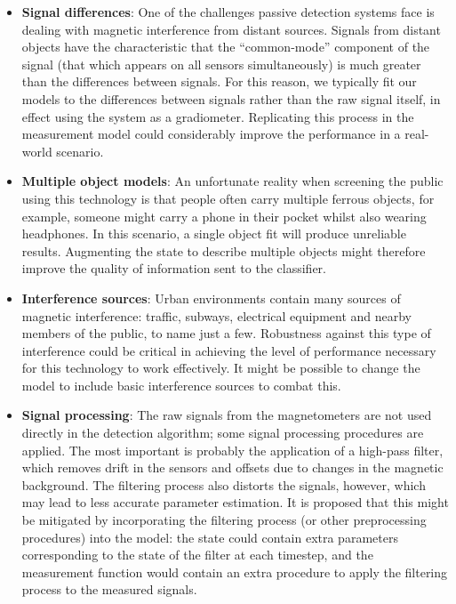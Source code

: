 \documentclass[10pt, a4paper, twocolumn]{article} %
\begin{document}
\begin{itemize}
	\item \textbf{Signal differences}: One of the challenges passive detection systems face is dealing with magnetic interference from distant sources. Signals from distant objects have the characteristic that the “common-mode” component of the signal (that which appears on all sensors simultaneously) is much greater than the differences between signals. For this reason, we typically fit our models to the differences between signals rather than the raw signal itself, in effect using the system as a gradiometer. Replicating this process in the measurement model could considerably improve the performance in a real-world scenario.
	
	\item \textbf{Multiple object models}: An unfortunate reality when screening the public using this technology is that people often carry multiple ferrous objects, for example, someone might carry a phone in their pocket whilst also wearing headphones. In this scenario, a single object fit will produce unreliable results. Augmenting the state to describe multiple objects might therefore improve the quality of information sent to the classifier.
	
	\item \textbf{Interference sources}: Urban environments contain many sources of magnetic interference: traffic, subways, electrical equipment and nearby members of the public, to name just a few. Robustness against this type of interference could be critical in achieving the level of performance necessary for this technology to work effectively. It might be possible to change the model to include basic interference sources to combat this.
	
	\item \textbf{Signal processing}: The raw signals from the magnetometers are not used directly in the detection algorithm; some signal processing procedures are applied. The most important is probably the application of a high-pass filter, which removes drift in the sensors and offsets due to changes in the magnetic background. The filtering process also distorts the signals, however, which may lead to less accurate parameter estimation. It is proposed that this might be mitigated by incorporating the filtering process (or other preprocessing procedures) into the model: the state could contain extra parameters corresponding to the state of the filter at each timestep, and the measurement function would contain an extra procedure to apply the filtering process to the measured signals.
\end{itemize}
\end{document}
